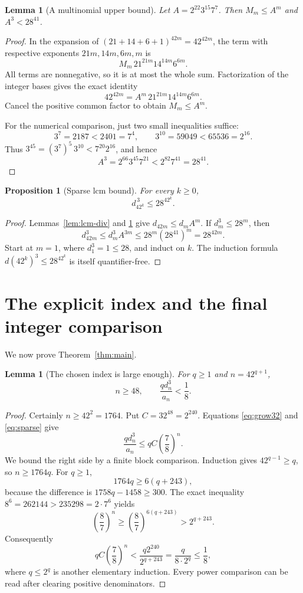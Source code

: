 \documentclass[11pt]{article}
\newtheorem{lemma}[theorem]{Lemma}
\newtheorem{proposition}[theorem]{Proposition}
\theoremstyle{definition}\newtheorem{definition}[theorem]{Definition}
\theoremstyle{remark}\newtheorem{remark}[theorem]{Remark}
\begin{document}
\begin{lemma}[A multinomial upper bound]\label{lem:multibound}
Let $A=2^{22}3^{15}7^7$. Then $M_m\le A^m$ and $A^3<28^{41}$.
\end{lemma}
\begin{proof}
In the expansion of $(21+14+6+1)^{42m}=42^{42m}$, the term with respective
exponents $21m,14m,6m,m$ is
\[
 M_m\,21^{21m}14^{14m}6^{6m}.
\]
All terms are nonnegative, so it is at most the whole sum. Factorization of
the integer bases gives the exact identity
\[
 42^{42m}=A^m\,21^{21m}14^{14m}6^{6m}.
\]
Cancel the positive common factor to obtain $M_m\le A^m$.

For the numerical comparison, just two small inequalities suffice:
\[
 3^7=2187<2401=7^4,\qquad
 3^{10}=59049<65536=2^{16}.
\]
Thus $3^{45}=(3^7)^5\,3^{10}<7^{20}2^{16}$, and hence
\[
 A^3=2^{66}3^{45}7^{21}<2^{82}7^{41}=28^{41}.
\]
\end{proof}

\begin{proposition}[Sparse lcm bound]\label{prop:sparse}
For every $k\ge0$,
\begin{equation}\label{eq:sparse}
 \boxed{d_{42^k}^{\,3}\le28^{42^k}.}
\end{equation}
\end{proposition}
\begin{proof}
Lemmas~\ref{lem:lcm-div} and \ref{lem:multibound} give
$d_{42m}\le d_mA^m$. If $d_m^3\le28^m$, then
\[
 d_{42m}^3\le d_m^3A^{3m}\le28^m(28^{41})^m=28^{42m}.
\]
Start at $m=1$, where $d_1^3=1\le28$, and induct on $k$.
The induction formula $d(42^k)^3\le28^{42^k}$ is itself quantifier-free.
\end{proof}

\section{The explicit index and the final integer comparison}\label{sec:finish}
We now prove Theorem~\ref{thm:main}.

\begin{lemma}[The chosen index is large enough]\label{lem:index}
For $q\ge1$ and $n=42^{q+1}$,
\begin{equation}\label{eq:index-small}
 n\ge48,\qquad \frac{qd_n^3}{a_n}<\frac18.
\end{equation}
\end{lemma}
\begin{proof}
Certainly $n\ge42^2=1764$. Put $C=32^{48}=2^{240}$.
Equations \eqref{eq:grow32} and \eqref{eq:sparse} give
\[
 \frac{qd_n^3}{a_n}\le qC\left(\frac78\right)^n.
\]
We bound the right side by a finite block comparison. Induction gives
$42^{q-1}\ge q$, so $n\ge1764q$. For $q\ge1$,
\[
 1764q\ge6(q+243),
\]
because the difference is $1758q-1458\ge300$.
The exact inequality $8^6=262144>235298=2\cdot7^6$ yields
\[
 \left(\frac87\right)^n
 \ge\left(\frac87\right)^{6(q+243)}>2^{q+243}.
\]
Consequently
\[
 qC\left(\frac78\right)^n
 <\frac{q2^{240}}{2^{q+243}}
 =\frac{q}{8\cdot2^q}\le\frac18,
\]
where $q\le2^q$ is another elementary induction.
Every power comparison can be read after clearing positive denominators.
\end{proof}
\end{document}
